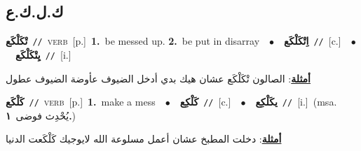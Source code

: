 \documentclass[10pt,a4paper,twoside]{article} %
\begin{document}
\begin{multicols}{2}
\vspace{-3mm}
\subsection*{\color{blue}\foreignlanguage{arabic}{ك.ل.ك.ع}\color{blue}{}} 

{\setlength\topsep{0pt}\textbf{\foreignlanguage{arabic}{تْكَلْكَع}}\ {\color{gray}\texttt{//}\color{black}}\ \textsc{verb}\ [p.]\ \textbf{1.}~be messed up.  \textbf{2.}~be put in disarray\ \ $\bullet$\ \ \setlength\topsep{0pt}\textbf{\foreignlanguage{arabic}{اِتْكَلْكَع}}\ {\color{gray}\texttt{//}\color{black}}\ [c.]\ \ $\bullet$\ \ \setlength\topsep{0pt}\textbf{\foreignlanguage{arabic}{يِتْكَلْكَع}}\ {\color{gray}\texttt{//}\color{black}}\ [i.]\  \begin{flushright}\color{gray}\foreignlanguage{arabic}{\textbf{\underline{\foreignlanguage{arabic}{أمثلة}}}: الصالون تْكَلْكَع عشان هيك بدي أدخل الضيوف عأوضة الضيوف عطول}\end{flushright}\color{black}} \vspace{2mm}

{\setlength\topsep{0pt}\textbf{\foreignlanguage{arabic}{كَلْكَع}}\ {\color{gray}\texttt{//}\color{black}}\ \textsc{verb}\ [p.]\ \textbf{1.}~make a mess\ \ $\bullet$\ \ \setlength\topsep{0pt}\textbf{\foreignlanguage{arabic}{كَلْكِع}}\ {\color{gray}\texttt{//}\color{black}}\ [c.]\ \ $\bullet$\ \ \setlength\topsep{0pt}\textbf{\foreignlanguage{arabic}{يكَلْكِع}}\ {\color{gray}\texttt{//}\color{black}}\ [i.]\ \color{gray}(msa. \foreignlanguage{arabic}{يُحْدِث فوضى}~\foreignlanguage{arabic}{\textbf{١.}})\color{black}\  \begin{flushright}\color{gray}\foreignlanguage{arabic}{\textbf{\underline{\foreignlanguage{arabic}{أمثلة}}}: دخلت المطبخ عشان أعمل مسلوعة الله لايوجيك كَلْكَعت الدنيا}\end{flushright}\color{black}} \vspace{2mm}


\end{multicols}
\end{document}
